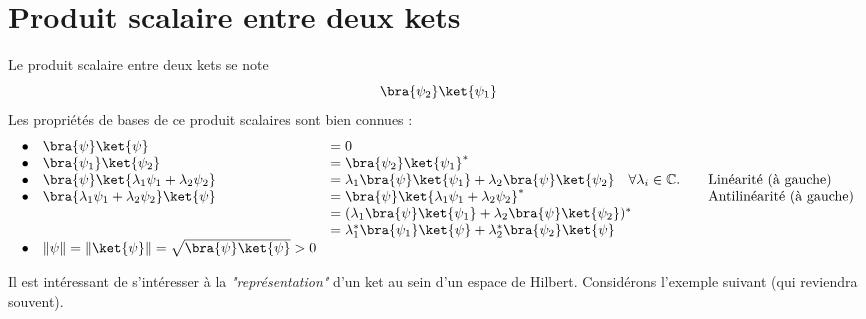 \section{Produit scalaire entre deux kets}
Le produit scalaire entre deux kets se note
\begin{equation}
\bra{\psi_2}\ket{\psi_1}
\end{equation}
\newpage
Les propriétés de bases de ce produit scalaires sont bien connues :
\begin{equation}
\begin{array}{llll}
\bullet & \bra{\psi}\ket{\psi} &= 0\\
\bullet & \bra{\psi_1}\ket{\psi_2} &= \bra{\psi_2}\ket{\psi_1}^*\\
\bullet & \bra{\psi}\ket{\lambda_1\psi_1+\lambda_2\psi_2} &= \lambda_1\bra{\psi}\ket{\psi_1}
+\lambda_2\bra{\psi}\ket{\psi_2}\quad \forall \lambda_i\in\mathbb{C}.\quad
& \text{Linéarité (à gauche)}\\
\bullet & \bra{\lambda_1\psi_1+\lambda_2\psi_2}\ket{\psi} &= \bra{\psi}\ket{\lambda_1
\psi_1+\lambda_2\psi_2}^* \quad & \text{Antilinéarité (à gauche)}\\
&  &= (\lambda_1\bra{\psi}\ket{\psi_1}+\lambda_2\bra{\psi}\ket{\psi_2})^*\\
&  &= \lambda_1^*\bra{\psi_1}\ket{\psi} +  \lambda_2^*\bra{\psi_2}\ket{\psi}\\
\bullet & \|\psi\| = \|\ket{\psi}\| = \sqrt{\bra{\psi}\ket{\psi}}>0
\end{array}
\end{equation}

Il est intéressant de s'intéresser à la \textit{"représentation"} d'un ket au sein 
d'un espace de Hilbert. Considérons l’exemple suivant (qui reviendra souvent).\\

